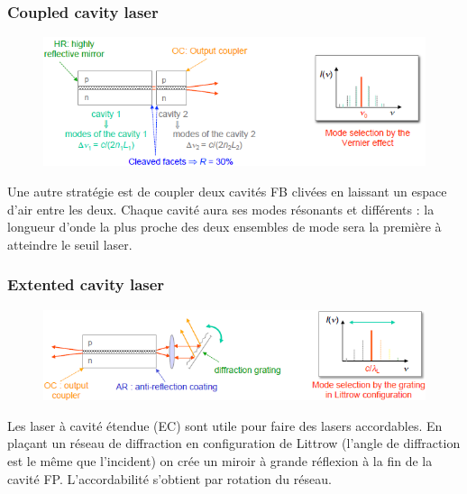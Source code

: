 \subsubsection{Coupled cavity laser}
	\begin{figure}
	\vspace{-5mm}
	\includegraphics[scale=0.6]{ch4/image20}
	\end{figure}
Une autre stratégie est de coupler deux cavités FB clivées en laissant un espace d'air entre les deux.
Chaque cavité aura ses modes résonants et différents : la longueur d'onde la plus proche des deux
ensembles de mode sera la première à atteindre le seuil laser.\\


\subsubsection{Extented cavity laser}
	\begin{figure}
	\vspace{-5mm}
	\includegraphics[scale=0.6]{ch4/image21}
	\end{figure}
Les laser à cavité étendue (EC) sont utile pour faire des lasers accordables. En plaçant un réseau de
diffraction en configuration de Littrow (l'angle de diffraction est le même que l'incident) on crée
un miroir à grande réflexion à la fin de la cavité FP. L'accordabilité s'obtient par rotation du 
réseau.

